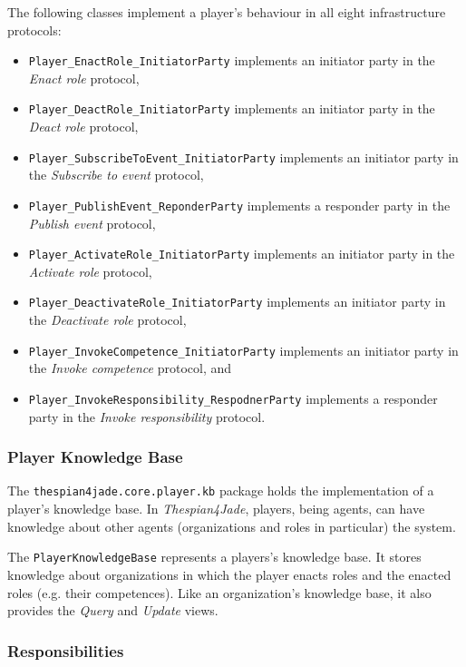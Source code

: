 The following classes implement a player's behaviour in all eight infrastructure protocols:
\begin{itemize}
	\item \texttt{Player\_EnactRole\_InitiatorParty} implements an initiator party in the \textit{Enact role} protocol,
	\item \texttt{Player\_DeactRole\_InitiatorParty} implements an initiator party in the \textit{Deact role} protocol,
	\item \texttt{Player\_SubscribeToEvent\_InitiatorParty} implements an initiator party in the \textit{Subscribe to event} protocol,
	\item \texttt{Player\_PublishEvent\_ReponderParty} implements a responder party in the \textit{Publish event} protocol,
	\item \texttt{Player\_ActivateRole\_InitiatorParty} implements an initiator party in the \textit{Activate role} protocol,
	\item \texttt{Player\_DeactivateRole\_InitiatorParty} implements an initiator party in the \textit{Deactivate role} protocol,
	\item\texttt{Player\_InvokeCompetence\_InitiatorParty} implements an initiator party in the \textit{Invoke competence} protocol, and
	\item\texttt{Player\_InvokeResponsibility\_RespodnerParty} implements a responder party in the \textit{Invoke responsibility} protocol.
\end{itemize}

\subsubsection{Player Knowledge Base}

The \texttt{thespian4jade.core.player.kb} package holds the implementation of a player's knowledge base.
In \textit{Thespian4Jade}, players, being agents, can have knowledge about other agents (organizations and roles in particular) the system.

The \texttt{PlayerKnowledgeBase} represents a players's knowledge base.
It stores knowledge about organizations in which the player enacts roles and the enacted roles (e.g. their competences).
Like an organization's knowledge base, it also provides the \textit{Query} and \textit{Update} views.

\subsubsection{Responsibilities}

